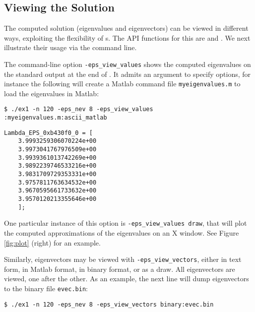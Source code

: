 \subsection{Viewing the Solution}
\label{sec:epsviewers}

The computed solution (eigenvalues and eigenvectors) can be viewed in different ways, exploiting the flexibility of s. The API functions for this are  and . We next illustrate their usage via the command line.

The command-line option \Verb!-eps_view_values! shows the computed eigenvalues on the standard output at the end of . It admits an argument to specify  options, for instance the following will create a Matlab command file \texttt{myeigenvalues.m} to load the eigenvalues in Matlab:
\begin{Verbatim}[fontsize=\footnotesize,numbers=none]
   $ ./ex1 -n 120 -eps_nev 8 -eps_view_values :myeigenvalues.m:ascii_matlab
\end{Verbatim}

\begin{Verbatim}[fontsize=\footnotesize,numbers=none]
    Lambda_EPS_0xb430f0_0 = [
    3.9993259306070224e+00
    3.9973041767976509e+00
    3.9939361013742269e+00
    3.9892239746533216e+00
    3.9831709729353331e+00
    3.9757811763634532e+00
    3.9670595661733632e+00
    3.9570120213355646e+00
    ];
\end{Verbatim}

One particular instance of this option is \Verb!-eps_view_values draw!, that will plot the computed approximations of the eigenvalues on an X window. See Figure \ref{fig:plot} (right) for an example.

Similarly, eigenvectors may be viewed with \Verb!-eps_view_vectors!, either in text form, in Matlab format, in binary format, or as a draw. All eigenvectors are viewed, one after the other. As an example, the next line will dump eigenvectors to the binary file \texttt{evec.bin}:
\begin{Verbatim}[fontsize=\footnotesize,numbers=none]
   $ ./ex1 -n 120 -eps_nev 8 -eps_view_vectors binary:evec.bin
\end{Verbatim}


